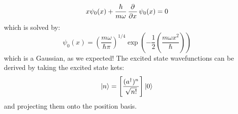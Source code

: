 \begin{equation}
    x\psi_0(x) + \frac{\hbar}{m\omega}\dpd{}{x}\psi_0(x) = 0
\end{equation}
which is solved by:
\begin{equation}
    \psi_0(x) = \left(\frac{m\omega}{\hbar \pi}\right)^{1/4}\exp\left(-\frac{1}{2}\left(\frac{m\omega x^2}{\hbar}\right)\right)
\end{equation}
which is a Gaussian, as we expected! The excited state wavefunctions can be derived by taking the excited state kets:
\begin{equation}
    \lvert n \rangle = \left[\frac{(a^\dag)^n}{\sqrt{n!}}\right]\lvert 0 \rangle
\end{equation}
and projecting them onto the position basis.